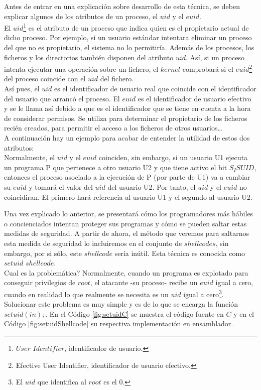 \documentclass [titlepage, 12pt]{article}
\begin{document}
Antes de entrar en una explicaci\'on sobre desarrollo de esta t\'ecnica, se deben explicar algunos de los atributos de un proceso, el $uid$ y el $euid$.\\
El $uid$\footnote{$User$ $Identifier$, identificador de usuario.} es el atributo de un proceso que indica quien es el propietario actual de dicho proceso. Por ejemplo, si un usuario est\'andar intentara eliminar un proceso del que no es propietario, el sistema no lo permitir\'ia. Adem\'as de los procesos, los ficheros y los directorios tambi\'en disponen del atributo $uid$. As\'i, si un proceso intenta ejecutar una operaci\'on sobre un fichero, el $kernel$ comprobar\'a si el $euid$\footnote{Efective User Identifier, identificador de usuario efectivo.} del proceso coincide con el $uid$ del fichero.\\
As\'i pues, el $uid$ es el identificador de usuario real que coincide con el identificador del usuario que arranc\'o el proceso. El $euid$ es el identificador de usuario efectivo y se le llama as\'i debido a que es el identificador que se tiene en cuenta a la hora de considerar permisos. Se utiliza para determinar el propietario de los ficheros reci\'en creados, para permitir el acceso a los ficheros de otros usuarios\ldots\\
A continuaci\'on hay un ejemplo para acabar de entender la utilidad de estos dos atributos:\\
Normalmente, el $uid$ y el $euid$ coinciden, sin embargo, si un usuario U1 ejecuta un programa P que pertenece a otro usuario U2 y que tiene activo el bit $S_ISUID$, entonces el proceso asociado a la ejecuci\'on de P (por parte de U1) va a cambiar su $euid$ y tomar\'a el valor del $uid$ del usuario U2. Por tanto, el $uid$ y el $euid$ no coincidiran. El primero har\'a referencia al usuario U1 y el segundo al usuario U2.\bigskip

Una vez explicado lo anterior, se presentar\'a c\'omo los programadores m\'as h\'abiles o concienciados intentan proteger sus programas y c\'omo se pueden saltar estas medidas de seguridad. A partir de ahora, el m\'etodo que veremos para saltarnos esta medida de seguridad lo incluiremos en el conjunto de $shellcodes$, sin embargo, por si s\'olo, este $shellcode$ ser\'ia in\'util. Esta t\'ecnica es conocida como $setuid$ $shellcode$.\\
Cual es la problem\'atica? Normalmente, cuando un programa es explotado para conseguir privilegios de $root$, el atacante -su proceso- recibe un $euid$ igual a cero, cuando en realidad lo que realmente se necesita es un $uid$ igual a cero\footnote{El $uid$ que identifica al $root$ es el 0.}. Solucionar este problema es muy simple y es de lo que se encarga la funci\'on $setuid(in);$. En el C\'odigo \ref{fig:setuidC} se muestra el c\'odigo fuente en $C$ y en el C\'odigo \ref{fig:setuidShellcode} su respectiva implementaci\'on en ensamblador.
\end{document}
